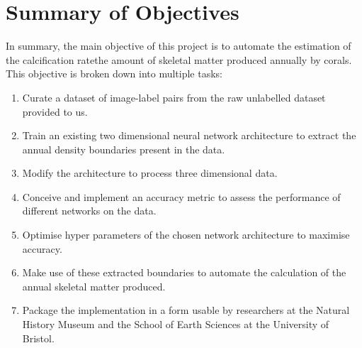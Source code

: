 
\section{Summary of Objectives}

In summary, the main objective of this project is to automate the estimation of the calcification rate\textemdash the amount of skeletal matter produced annually by corals. This objective is broken down into multiple tasks:

\begin{enumerate}
    \item Curate a dataset of image-label pairs from the raw unlabelled dataset provided to us.
    \item Train an existing two dimensional neural network architecture to extract the annual density boundaries present in the data.
    \item Modify the architecture to process three dimensional data.
    \item Conceive and implement an accuracy metric to assess the performance of different networks on the data.
    \item Optimise hyper parameters of the chosen network architecture to maximise accuracy.
    \item Make use of these extracted boundaries to automate the calculation of the annual skeletal matter produced.
    \item Package the implementation in a form usable by researchers at the Natural History Museum and the School of Earth Sciences at the University of Bristol.
\end{enumerate}
